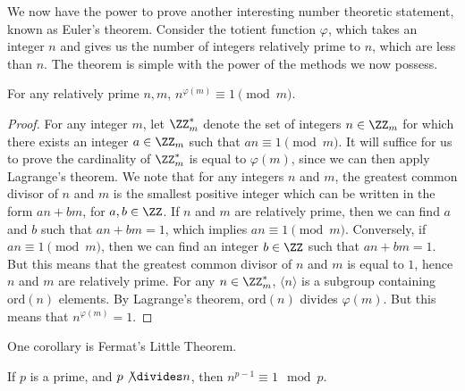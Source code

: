 We now have the power to prove another interesting number theoretic statement, known as Euler's theorem. Consider the totient function $\varphi$, which takes an integer $n$ and gives us the number of integers relatively prime to $n$, which are less than $n$. The theorem is simple with the power of the methods we now possess.

\begin{corollary}
    For any relatively prime $n,m$, $n^{\varphi(m)} \equiv 1 \pmod{m}$.
\end{corollary}
\begin{proof}
    For any integer $m$, let $\ZZ_m^*$ denote the set of integers $n \in \ZZ_m$ for which there exists an integer $a \in \ZZ_m$ such that $an \equiv 1 \pmod{m}$. It will suffice for us to prove the cardinality of $\ZZ_m^*$ is equal to $\varphi(m)$, since we can then apply Lagrange's theorem. We note that for any integers $n$ and $m$, the greatest common divisor of $n$ and $m$ is the smallest positive integer which can be written in the form $an + bm$, for $a,b \in \ZZ$. If $n$ and $m$ are relatively prime, then we can find $a$ and $b$ such that $an + bm = 1$, which implies $an \equiv 1 \pmod{m}$. Conversely, if $an \equiv 1 \pmod{m}$, then we can find an integer $b \in \ZZ$ such that $an + bm = 1$. But this means that the greatest common divisor of $n$ and $m$ is equal to $1$, hence $n$ and $m$ are relatively prime. For any $n \in \ZZ_m^*$, $\langle n \rangle$ is a subgroup containing $\text{ord}(n)$ elements. By Lagrange's theorem, $\text{ord}(n)$ divides $\varphi(m)$. But this means that $n^{\varphi(m)} = 1$.
\end{proof}

One corollary is Fermat's Little Theorem.

\begin{corollary}If $p$ is a prime, and $p \not \divides n$, then $n^{p-1} \equiv 1 \mod{p}$.
\end{corollary}

